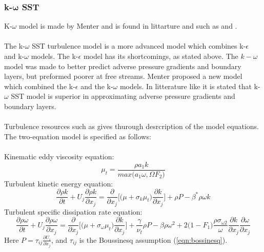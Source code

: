 \documentclass[a4paper, 12pt]{report}
\begin{document}
\subsubsection{k-$\boldsymbol{\omega}$ SST}
K-$\omega$ model is made by Menter \cite{SST} and is found in littarture and such as \cite{CFD} and \cite{Wilcox}.\\
\\
The k-$\omega$ SST turbulence model is a more advanced model which combines k-$\epsilon$ and k-$\omega$ models. The k-$\epsilon$ model has its shortcomings, as stated above. The $k-\omega$ model was made to better predict adverse pressure gradients and boundary layers, but preformed poorer at free streams. Menter \cite{reviewOfSSTModel} proposed a new model which combined the k-$\epsilon$ and the k-$\omega$ models. In litterature like \cite{CFD} it is stated that k-$\omega$ SST model is superior in approximating adverse pressure gradients and boundary layers.\\
\\
Turbulence resources such as \cite{NASA_SST} gives thurough desrcription of the model equations. The two-equation model is specified as follows:\\
\\
Kinematic eddy viscosity equation:
\begin{equation}
\mu_t = \frac{\rho a_1 k}{max\big(a_1\omega, \Omega F_2\big)}
\label{eqn:kOmegaSSTTurbulentViscosity}
\end{equation}
Turbulent kinetic energy equation:
\begin{equation}
\frac{\partial \rho k}{\partial t} + U_j \frac{\partial \rho k}{\partial x_j} = \frac{\partial }{\partial x_j}\Big[\big(\mu + \sigma_k\mu_t\big)\frac{\partial k}{\partial x_j} \Big] + \rho P - \beta^* \rho \omega k
\label{eqn:kOmegaSSTKequation}
\end{equation}
Turbulent specific dissipation rate equation:
\begin{equation}
\frac{\partial \rho \omega}{\partial t} + U_j \frac{\partial \rho \omega}{\partial x_j} =
\frac{\partial }{\partial x_j}\Big[\big(\mu + \sigma_{\omega}\mu_t\big)\frac{\partial k}{\partial x_j} \Big] + \frac{\gamma}{\nu_t} \rho P - \beta \rho \omega^2 + 2\big(1 -F_1\big)\frac{\rho \sigma_{\omega 2}}{\omega}\frac{\partial k}{\partial x_j}\frac{\partial \omega}{\partial x_j}
\label{eqn:kOmegaSSTOmegaequation}
\end{equation}
Here $P = \tau_{ij}\frac{\partial U_i}{\partial x_j}$, and $\tau_{ij}$ is the Boussinesq assumption (\ref{eqn:bossinesq}).
\end{document}
